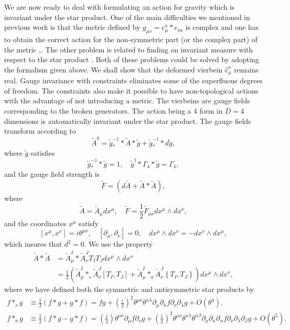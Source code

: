 \documentclass[a4paper,a4paper]{article}
\begin{document}
We are now ready to deal with formulating an action for gravity which is
invariant under the star product. One of the main difficulties we mentioned in
previous work is that the metric defined by $g_{\mu\nu}=e_{\mu}^{a}\ast e_{\nu
a}$ is complex \cite{complex} and one has to obtain the correct action for the
non-symmetric part (or the complex part) of the metric \cite{ES}%
,\cite{schrod}. The other problem is related to finding an invariant measure
with respect to the star product \cite{NK}. Both of these problems could be
solved by adopting the formalism given above. We shall show that the deformed
vierbein $\widehat{e}_{\mu}^{a}$ remains real. Gauge invariance with
constraints eliminates some of the superfluous degrees of freedom. The
constraints also make it possible to have non-topological actions with the
advantage of not introducing a metric. The vierbeins are gauge fields
corresponding to the broken generators. The action being a $4$ form in $D=4$
dimensions is automatically invariant under the star product. The gauge fields
transform according to
\[
\widetilde{A}^{g}=\widetilde{g}_{\ast}^{-1}\ast\widetilde{A}\ast\widetilde
{g}+\widetilde{g}_{\ast}^{-1}\ast d\widetilde{g},
\]
where $\widetilde{g}$ satisfies
\[
\widetilde{g}_{\ast}^{-1}\ast\widetilde{g}=1,\quad\widetilde{g}^{\dagger}%
\ast\Gamma_{4}\ast\widetilde{g}=\Gamma_{4},
\]
and the gauge field strength is
\[
\widetilde{F}=(d\widetilde{A}+\widetilde{A}\ast\widetilde{A}),
\]
where
\[
\widetilde{A}=\widetilde{A}_{\mu}dx^{\mu},\quad\widetilde{F}=\frac{1}%
{2}\widetilde{F}_{\mu\nu}dx^{\mu}\wedge dx^{\nu},
\]
and the coordinates $x^{\mu}$ satisfy
\[
\left[  x^{\mu},x^{\nu}\right]  =i\theta^{\mu\nu},\quad\left[  \partial_{\mu
},\partial_{\nu}\right]  =0,\quad dx^{\mu}\wedge dx^{\nu}=-dx^{\nu}\wedge
dx^{\mu},
\]
which insures that $d^{2}=0.$ We use the property
\begin{align*}
\widetilde{A}\ast\widetilde{A}  &  =\widetilde{A}_{\mu}^{I}\ast\widetilde
{A}_{\nu}^{J}T_{I}T_{J}dx^{\mu}\wedge dx^{\nu}\\
&  =\frac{1}{2}\left(  \widetilde{A}_{\mu}^{I}\ast_{s}\widetilde{A}_{\nu}%
^{J}\left[  T_{I},T_{J}\right]  +\widetilde{A}_{\mu}^{I}\ast_{a}\widetilde
{A}_{\nu}^{J}\left\{  T_{I},T_{J}\right\}  \right)  dx^{\mu}\wedge dx^{\nu},
\end{align*}
where we have defined both the symmetric and antisymmetric star products by
\begin{align*}
f\ast_{s}g  &  \equiv\frac{1}{2}\left(  f\ast g+g\ast f\right)  =fg+\left(
\frac{i}{2}\right)  ^{2}\theta^{\mu\nu}\theta^{\kappa\lambda}\partial_{\mu
}\partial_{\kappa}f\partial_{\nu}\partial_{\lambda}g+O(\theta^{4}).\\
f\ast_{a}g  &  \equiv\frac{1}{2}\left(  f\ast g-g\ast f\right)  =\left(
\frac{i}{2}\right)  \theta^{\mu\nu}\partial_{\mu}f\partial_{\nu}g+\left(
\frac{i}{2}\right)  ^{3}\theta^{\mu\nu}\theta^{\kappa\lambda}\theta
^{\alpha\beta}\partial_{\mu}\partial_{\kappa}\partial_{\alpha}f\partial_{\nu
}\partial_{\lambda}\partial_{\beta}g+O(\theta^{5}).
\end{align*}
\end{document}
